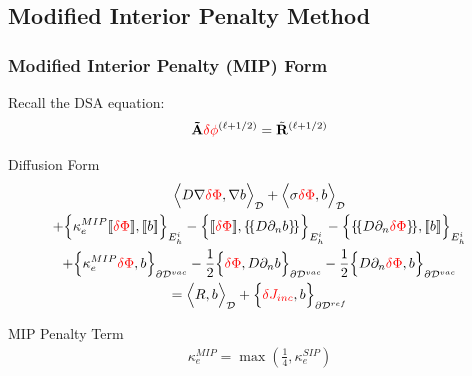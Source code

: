 \documentclass[compress,10pt]{beamer}
\renewcommand{\vec}[1]{\mathbf{#1}}
\newcommand{\tcr}[1]{\textcolor{red}{#1}}
\begin{document}
\subsection{Modified Interior Penalty Method}
\begin{frame}[t]\frametitle{Modified Interior Penalty (MIP) Form}

Recall the DSA equation:
\begin{equation*}
{\bf \tilde{A}} \tcr{\delta \phi}^{(\ell+1/2)} = \tilde{{\bf R}}^{(\ell+1/2)}
\end{equation*}

\begin{block}{Diffusion Form}{\footnotesize
\begin{gather*}
\Big<  D \vec{\nabla} \tcr{\delta \Phi} , \vec{\nabla} b  \Big>_{\mathcal{D}} 
+ \Big<  \sigma \tcr{\delta  \Phi} ,  b  \Big>_{\mathcal{D}}    \\
+ \Big\{ \kappa_e^{MIP} [\![ \tcr{\delta  \Phi} ]\!] , [\![  b ]\!]\Big\}_{E_h^i} 
- \Big\{  [\![  \tcr{\delta \Phi} ]\!] , \{\!\{  D \partial_n b \}\!\}\Big\}_{E_h^i} 
- \Big\{ \{\!\{  D \partial_n \tcr{\delta \Phi} \}\!\} , [\![ b ]\!]\Big\}_{E_h^i} \\
+ \Big\{ \kappa_e^{MIP} \tcr{\delta \Phi} ,   b \Big\}_{\partial \mathcal{D}^{vac}} -  \frac{1}{2} \Big\{  \tcr{\delta \Phi}  ,  D \partial_n b \Big\}_{\partial \mathcal{D}^{vac}} -  \frac{1}{2} \Big\{   D \partial_n \tcr{\delta \Phi} ,   b \Big\}_{\partial \mathcal{D}^{vac}}  \\
 = \Big<  R , b  \Big>_{\mathcal{D}}  +  \Big\{  \tcr{\delta J_{inc}}, b  \Big\}_{\partial \mathcal{D}^{ref}}
\end{gather*} }
\end{block}
	\begin{block}{MIP Penalty Term}{\footnotesize
		\begin{align*}
			\kappa_e^{MIP} = \max(\frac{1}{4},  \kappa_e^{SIP})
		\end{align*} }
	\end{block}
\end{frame}
\end{document}
